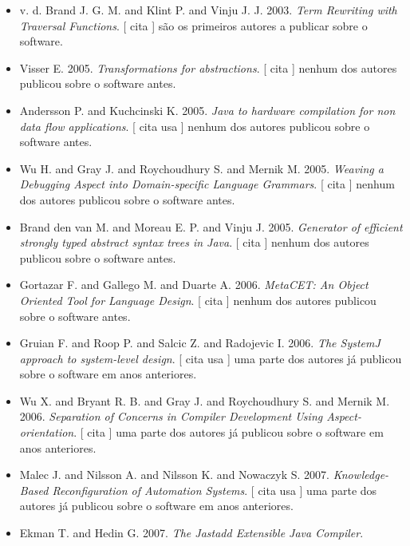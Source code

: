 \begin{itemize}
\item v. d. Brand J. G. M. and Klint P. and Vinju J. J.
      2003.
        \textit{ Term Rewriting with Traversal Functions}.
      [
          cita
      ]
são os primeiros autores a publicar sobre o software.
\item Visser E.
      2005.
        \textit{ Transformations for abstractions}.
      [
          cita
      ]
nenhum dos autores publicou sobre o software antes.
\item Andersson P. and Kuchcinski K.
      2005.
        \textit{ Java to hardware compilation for non data flow applications}.
      [
          cita
          usa
      ]
nenhum dos autores publicou sobre o software antes.
\item Wu H. and Gray J. and Roychoudhury S. and Mernik M.
      2005.
        \textit{ Weaving a Debugging Aspect into Domain-specific Language Grammars}.
      [
          cita
      ]
nenhum dos autores publicou sobre o software antes.
\item Brand den van M. and Moreau E. P. and Vinju J.
      2005.
        \textit{ Generator of efficient strongly typed abstract syntax trees in Java}.
      [
          cita
      ]
nenhum dos autores publicou sobre o software antes.
\item Gortazar F. and Gallego M. and Duarte A.
      2006.
        \textit{ MetaCET: An Object Oriented Tool for Language Design}.
      [
          cita
      ]
nenhum dos autores publicou sobre o software antes.
\item Gruian F. and Roop P. and Salcic Z. and Radojevic I.
      2006.
        \textit{ The SystemJ approach to system-level design}.
      [
          cita
          usa
      ]
uma parte dos autores já publicou sobre o software em anos anteriores.
\item Wu X. and Bryant R. B. and Gray J. and Roychoudhury S. and Mernik M.
      2006.
        \textit{ Separation of Concerns in Compiler Development Using Aspect-orientation}.
      [
          cita
      ]
uma parte dos autores já publicou sobre o software em anos anteriores.
\item Malec J. and Nilsson A. and Nilsson K. and Nowaczyk S.
      2007.
        \textit{ Knowledge-Based Reconfiguration of Automation Systems}.
      [
          cita
          usa
      ]
uma parte dos autores já publicou sobre o software em anos anteriores.
\item Ekman T. and Hedin G.
      2007.
        \textit{ The Jastadd Extensible Java Compiler}.

\end{itemize}
